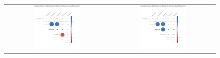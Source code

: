 \begin{figure}[htb]
\begin{tabular}{cc}
 \includegraphics[width=0.45\textwidth]{images/chap-evaluation/corr-effective-first/non-gamifiedApprentice1.png}&
 \includegraphics[width=0.45\textwidth]{images/chap-evaluation/corr-effective-first/ont-gamifiedApprentice1.png}
 \end{tabular}
 \fautor
\end{figure}




